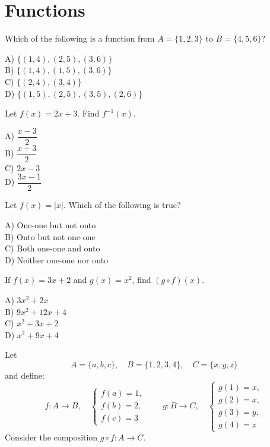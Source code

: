 \documentclass[12pt,letterpaper, onecolumn]{exam}
\begin{document}
\section{Functions}
\begin{questions}

\question[3 Marks]
Which of the following is a function from \(A=\{1,2,3\}\) to \(B=\{4,5,6\}\)?
\begin{multicols}{2}
A) \(\{(1,4),(2,5),(3,6)\}\)\\
B) \(\{(1,4),(1,5),(3,6)\}\)\\
C) \(\{(2,4),(3,4)\}\)\\
D) \(\{(1,5),(2,5),(3,5),(2,6)\}\)
\end{multicols}
\droppoints
\answerspace[1.2cm]

\question[3 Marks]
Let \(f(x)=2x+3\). Find \(f^{-1}(x)\).
\begin{multicols}{2}
A) \(\dfrac{x-3}{2}\)\\ B) \(\dfrac{x+3}{2}\)\\ C) \(2x-3\)\\ D) \(\dfrac{3x-1}{2}\)
\end{multicols}
\droppoints
\answerspace[1.2cm]

\question[3 Marks]
Let \(f(x)=|x|\). Which of the following is true?
\begin{multicols}{2}
A) One-one but not onto\\
B) Onto but not one-one\\
C) Both one-one and onto\\
D) Neither one-one nor onto
\end{multicols}
\droppoints
\answerspace[1.4cm]

\question[4 Marks]
If \(f(x)=3x+2\) and \(g(x)=x^2\), find \((g\circ f)(x)\).
\begin{multicols}{2}
A) \(3x^2+2x\)\\ B) \(9x^2+12x+4\)\\ C) \(x^2+3x+2\)\\ D) \(x^2+9x+4\)
\end{multicols}
\droppoints
\answerspace[1.2cm]

\question[5 Marks]
Let 
\[
A = \{a,b,c\}, \quad B = \{1,2,3,4\}, \quad C = \{x,y,z\}
\]
and define:
\[
f:A\to B, \quad 
\begin{cases}
f(a)=1,\\ f(b)=2,\\ f(c)=3
\end{cases}
\qquad
g:B\to C, \quad 
\begin{cases}
g(1)=x,\\ g(2)=x,\\ g(3)=y,\\ g(4)=z
\end{cases}
\]
Consider the composition \(g\circ f:A\to C\).


\end{questions}
\end{document}
